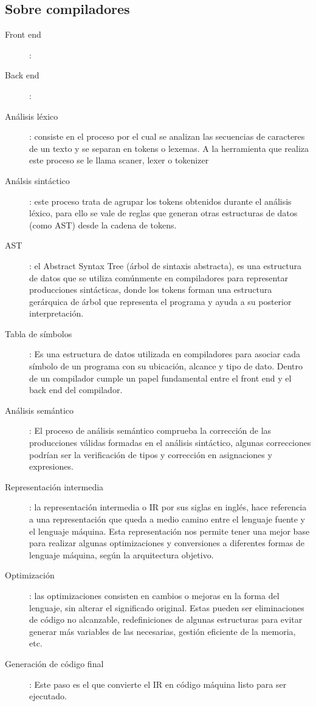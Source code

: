 \subsection{Sobre compiladores}
\begin{description}
    \item [Front end]:
    \item [Back end]: 
    \item [Análisis léxico]: consiste en el proceso por el cual se analizan las secuencias de caracteres de un texto y se separan en tokens o lexemas. A la herramienta que realiza este proceso se le llama scaner, lexer o tokenizer
    \item [Análsis sintáctico]: este proceso trata de agrupar los tokens obtenidos durante el análisis léxico, para ello se vale de reglas que generan otras estructuras de datos (como AST) desde la cadena de tokens.
    \item [AST]: el Abstract Syntax Tree (árbol de sintaxis abstracta), es una estructura de datos que se utiliza comúnmente en compiladores para representar producciones sintácticas, donde los tokens forman una estructura gerárquica de árbol que representa el programa y ayuda a su posterior interpretación.
    \item [Tabla de símbolos]: Es una estructura de datos utilizada en compiladores para asociar cada símbolo de un programa con su ubicación, alcance y tipo de dato. Dentro de un compilador cumple un papel fundamental entre el front end y el back end del compilador.
    \item [Análisis semántico]: El proceso de análisis semántico comprueba la corrección de las producciones válidas formadas en el análisis sintáctico, algunas correcciones podrían ser la verificación de tipos y corrección en asignaciones y expresiones.
    \item [Representación intermedia]: la representación intermedia o IR por sus siglas en inglés, hace referencia a una representación que queda a medio camino entre el lenguaje fuente y el lenguaje máquina. Esta representación nos permite tener una mejor base para realizar algunas optimizaciones y conversiones a diferentes formas de lenguaje máquina, según la arquitectura objetivo.
    \item [Optimización]: las optimizaciones consisten en cambios o mejoras en la forma del lenguaje, sin alterar el significado original. Estas pueden ser eliminaciones de código no alcanzable, redefiniciones de algunas estructuras para evitar generar más variables de las necesarias, gestión eficiente de la memoria, etc.
    \item [Generación de código final]: Este paso es el que convierte el IR en código máquina listo para ser ejecutado.
\end{description}